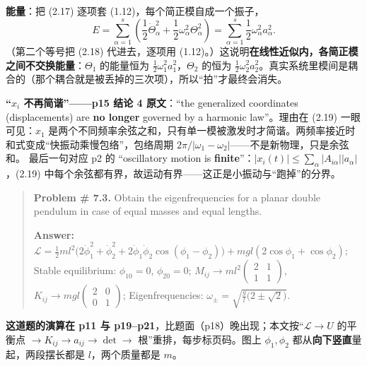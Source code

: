 \documentclass[11pt]{ctexart}
\begin{document}
\textbf{能量}：把 (2.17) 逐项套 (1.12)，每个简正模自成一个振子，
\[
E=\sum_{\alpha=1}^{s}\left(\frac12\dot\Theta_\alpha^2+\frac12\omega_\alpha^2\Theta_\alpha^2\right)=\sum_{\alpha=1}^{s}\frac12\omega_\alpha^2a_\alpha^2 .
\tag{2.20}
\]
（第二个等号把 (2.18) 代进去，逐项用 (1.12)。）这说明\textbf{在线性近似内，各简正模之间不交换能量}：$\Theta_1$ 的能量恒为 $\frac12\omega_1^2a_1^2$，$\Theta_2$ 的恒为 $\frac12\omega_2^2a_2^2$。真实系统里模间是耦合的（那个耦合就是被丢掉的三次项），所以“拍”才最终会消失。

\textbf{“$x_i$ 不再简谐”——p15 结论 4 原文}：“the generalized coordinates (displacements) are \textbf{no longer} governed by a harmonic law”。理由在 (2.19) 一眼可见：$x_1$ 是两个不同频率余弦之和，只有单一模被激发时才简谐。两频率接近时和式变成“快振动乘慢包络”，包络周期 $2\pi/|\omega_1-\omega_2|$——不是新物理，只是余弦和。
最后一句对应 p2 的 “oscillatory motion is \textbf{finite}”：$|x_i(t)|\le\sum_\alpha|A_{i\alpha}||a_\alpha|$，(2.19) 中每个余弦都有界，故运动有界——这正是小振动与“跑掉”的分界。



\begin{quote}
\small
\textbf{Problem \# 7.3.} Obtain the eigenfrequencies for a planar double pendulum in case of equal masses and equal lengths.

\textbf{Answer:}\quad $\mathcal{L}=\frac12ml^2\bigl(2\dot\phi_1^2+\dot\phi_2^2+2\dot\phi_1\dot\phi_2\cos(\phi_1-\phi_2)\bigr)+mgl(2\cos\phi_1+\cos\phi_2)$;\quad
Stable equilibrium: $\phi_{10}=0$, $\phi_{20}=0$;\quad
$M_{ij}\to ml^2\begin{pmatrix}2&1\\1&1\end{pmatrix}$,\ $K_{ij}\to mgl\begin{pmatrix}2&0\\0&1\end{pmatrix}$;\quad
Eigenfrequencies: $\omega_\pm=\sqrt{\frac{g}{l}\bigl(2\pm\sqrt2\bigr)}$.
\end{quote}

\textbf{这道题的演算在 p11 与 p19--p21}，比题面（p18）晚出现；本文按“$\mathcal{L}\to U$ 的平衡点 $\to K_{ij}\to a_{ij}\to\det\to$ 根”重排，每步标页码。图上 $\phi_1,\phi_2$ 都从\textbf{向下竖直}量起，两段摆长都是 $l$，两个质量都是 $m$。

\end{document}
